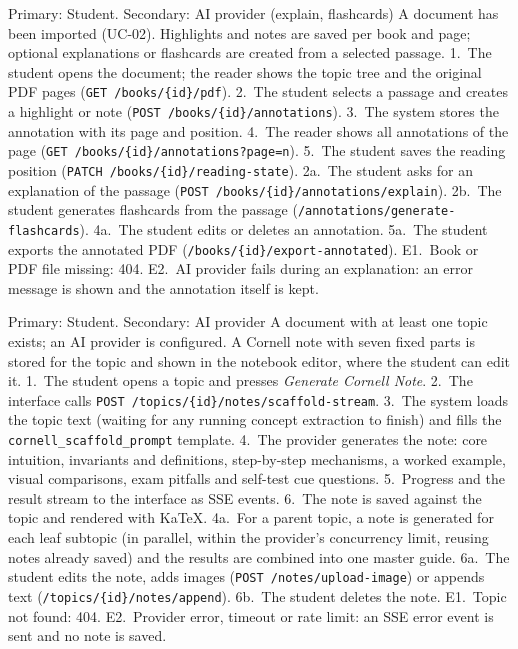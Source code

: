 {Primary: Student. Secondary: AI provider (explain, flashcards)}
{A document has been imported (UC-02).}
{Highlights and notes are saved per book and page; optional explanations or flashcards are
created from a selected passage.}
{1.~The student opens the document; the reader shows the topic tree and the original PDF pages
(\texttt{GET /books/\{id\}/pdf}). 2.~The student selects a passage and creates a highlight or
note (\texttt{POST /books/\{id\}/annotations}). 3.~The system stores the annotation with its page
and position. 4.~The reader shows all annotations of the page
(\texttt{GET /books/\{id\}/annotations?page=n}). 5.~The student saves the reading position
(\texttt{PATCH /books/\{id\}/reading-state}).}
{2a.~The student asks for an explanation of the passage
(\texttt{POST /books/\{id\}/annotations/explain}). 2b.~The student generates flashcards from the
passage (\texttt{/annotations/generate-flashcards}). 4a.~The student edits or deletes an
annotation. 5a.~The student exports the annotated PDF (\texttt{/books/\{id\}/export-annotated}).}
{E1.~Book or PDF file missing: 404. E2.~AI provider fails during an explanation: an error
message is shown and the annotation itself is kept.}

{Primary: Student. Secondary: AI provider}
{A document with at least one topic exists; an AI provider is configured.}
{A Cornell note with seven fixed parts is stored for the topic and shown in the notebook
editor, where the student can edit it.}
{1.~The student opens a topic and presses \emph{Generate Cornell Note}. 2.~The interface calls
\texttt{POST /topics/\{id\}/notes/scaffold-stream}. 3.~The system loads the topic text (waiting
for any running concept extraction to finish) and fills the \texttt{cornell\_scaffold\_prompt}
template. 4.~The provider
generates the note: core intuition, invariants and definitions, step-by-step mechanisms, a
worked example, visual comparisons, exam pitfalls and self-test cue questions. 5.~Progress and
the result stream to the interface as SSE events. 6.~The note is saved against the topic and
rendered with KaTeX.}
{4a.~For a parent topic, a note is generated for each leaf subtopic (in parallel, within the
provider's concurrency limit, reusing notes already saved) and the results are combined into one
master guide.
6a.~The student edits the note, adds images (\texttt{POST /notes/upload-image}) or appends
text (\texttt{/topics/\{id\}/notes/append}). 6b.~The student deletes the note.}
{E1.~Topic not found: 404. E2.~Provider error, timeout or rate limit: an SSE error event is
sent and no note is saved.}

